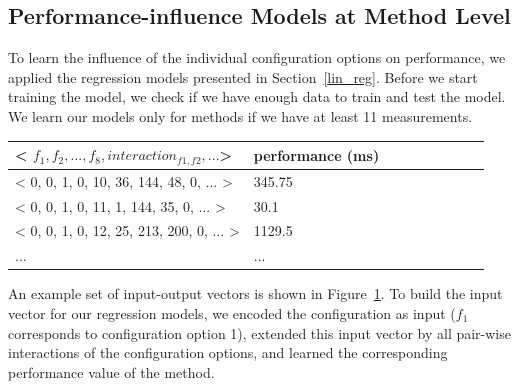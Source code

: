 

\subsection{Performance-influence Models at Method Level}
\label{perf_infl_models_m_lvl}

To learn the influence of the individual configuration options on performance, we applied the regression models presented in Section~\ref{lin_reg}. Before we start training the model, we check if we have enough data to train and test the model. We learn our models only for methods if we have at least 11 measurements. 

\begin{table}[h]
	\centering %
    \begin{tabular}{*{9}{l}}

        

        < $f_1, f_2, ..., f_8, interaction_{f1, f2}, ...$> & performance (ms) \\
       \toprule
        < 0, 0, 1, 0, 10, 36, 144, 48, 0, ... > & 345.75 \\
		< 0, 0, 1, 0, 11, 1, 144, 35, 0, ... > & 30.1 \\
		< 0, 0, 1, 0, 12, 25, 213, 200, 0, ... > & 1129.5 \\
		... & ...\\

    \end{tabular}
    \label{table:example:inp_outp}
\end{table}

An example set of input-output vectors is shown in Figure~\ref{table:example:inp_outp}. To build the input vector for our regression models, we encoded the configuration as input ($f_1$ corresponds to configuration option 1), extended this input vector by all pair-wise interactions of the configuration options, and learned the corresponding performance value of the method.


